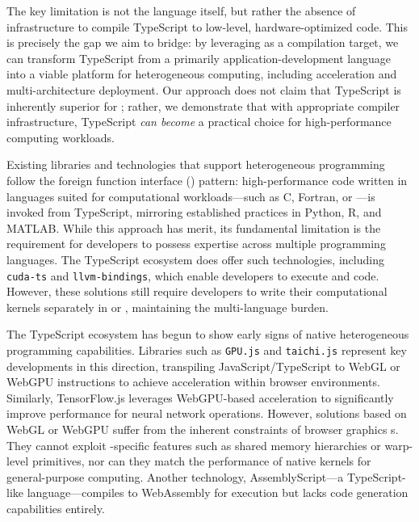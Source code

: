The key limitation is not the language itself, but rather the absence of infrastructure to compile TypeScript to low-level, hardware-optimized code. This is precisely the gap we aim to bridge: by leveraging   as a compilation target, we can transform TypeScript from a primarily application-development language into a viable platform for heterogeneous computing, including  acceleration and multi-architecture deployment. Our approach does not claim that TypeScript is inherently superior for ; rather, we demonstrate that with appropriate compiler infrastructure, TypeScript \textit{can become} a practical choice for high-performance computing workloads.


Existing libraries and technologies that support heterogeneous programming follow the foreign function interface () pattern: high-performance code written in languages suited for computational workloads---such as C, Fortran, or ---is invoked from TypeScript, mirroring established practices in Python, R, and MATLAB. While this approach has merit, its fundamental limitation is the requirement for developers to possess expertise across multiple programming languages. The TypeScript ecosystem does offer such technologies, including \texttt{cuda-ts} and \texttt{llvm-bindings}, which enable developers to execute   and  code. However, these solutions still require developers to write their computational kernels separately in  or  , maintaining the multi-language burden.

The TypeScript ecosystem has begun to show early signs of native heterogeneous programming capabilities. Libraries such as \texttt{GPU.js} and \texttt{taichi.js} represent key developments in this direction, transpiling JavaScript/TypeScript to WebGL or WebGPU instructions to achieve  acceleration within browser environments. Similarly, TensorFlow.js leverages WebGPU-based acceleration to significantly improve performance for neural network operations. However, solutions based on WebGL or WebGPU suffer from the inherent constraints of browser graphics s. They cannot exploit -specific features such as shared memory hierarchies or warp-level primitives, nor can they match the performance of native  kernels for general-purpose  computing. Another technology, AssemblyScript---a TypeScript-like language---compiles to WebAssembly for  execution but lacks  code generation capabilities entirely. 


